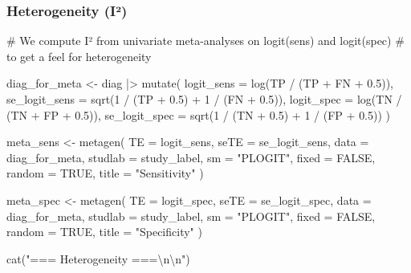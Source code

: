 \documentclass[
  letterpaper,
  DIV=11,
  numbers=noendperiod]{scrartcl}
\newenvironment{Shaded}{\begin{snugshade}}{\end{snugshade}}
\newcommand{\AttributeTok}[1]{\textcolor[rgb]{0.40,0.45,0.13}{#1}}
\newcommand{\CommentTok}[1]{\textcolor[rgb]{0.37,0.37,0.37}{#1}}
\newcommand{\ConstantTok}[1]{\textcolor[rgb]{0.56,0.35,0.01}{#1}}
\newcommand{\DecValTok}[1]{\textcolor[rgb]{0.68,0.00,0.00}{#1}}
\newcommand{\FloatTok}[1]{\textcolor[rgb]{0.68,0.00,0.00}{#1}}
\newcommand{\FunctionTok}[1]{\textcolor[rgb]{0.28,0.35,0.67}{#1}}
\newcommand{\NormalTok}[1]{\textcolor[rgb]{0.00,0.23,0.31}{#1}}
\newcommand{\OtherTok}[1]{\textcolor[rgb]{0.00,0.23,0.31}{#1}}
\newcommand{\SpecialCharTok}[1]{\textcolor[rgb]{0.37,0.37,0.37}{#1}}
\newcommand{\StringTok}[1]{\textcolor[rgb]{0.13,0.47,0.30}{#1}}
\begin{document}
\subsubsection{Heterogeneity (I²)}\label{heterogeneity-iuxb2}

\begin{Shaded}
\begin{Highlighting}[]
\CommentTok{\# We compute I² from univariate meta{-}analyses on logit(sens) and logit(spec)}
\CommentTok{\# to get a feel for heterogeneity}

\NormalTok{diag\_for\_meta }\OtherTok{\textless{}{-}}\NormalTok{ diag }\SpecialCharTok{|\textgreater{}}
  \FunctionTok{mutate}\NormalTok{(}
    \AttributeTok{logit\_sens =} \FunctionTok{log}\NormalTok{(TP }\SpecialCharTok{/}\NormalTok{ (TP }\SpecialCharTok{+}\NormalTok{ FN }\SpecialCharTok{+} \FloatTok{0.5}\NormalTok{)),}
    \AttributeTok{se\_logit\_sens =} \FunctionTok{sqrt}\NormalTok{(}\DecValTok{1} \SpecialCharTok{/}\NormalTok{ (TP }\SpecialCharTok{+} \FloatTok{0.5}\NormalTok{) }\SpecialCharTok{+} \DecValTok{1} \SpecialCharTok{/}\NormalTok{ (FN }\SpecialCharTok{+} \FloatTok{0.5}\NormalTok{)),}
    \AttributeTok{logit\_spec =} \FunctionTok{log}\NormalTok{(TN }\SpecialCharTok{/}\NormalTok{ (TN }\SpecialCharTok{+}\NormalTok{ FP }\SpecialCharTok{+} \FloatTok{0.5}\NormalTok{)),}
    \AttributeTok{se\_logit\_spec =} \FunctionTok{sqrt}\NormalTok{(}\DecValTok{1} \SpecialCharTok{/}\NormalTok{ (TN }\SpecialCharTok{+} \FloatTok{0.5}\NormalTok{) }\SpecialCharTok{+} \DecValTok{1} \SpecialCharTok{/}\NormalTok{ (FP }\SpecialCharTok{+} \FloatTok{0.5}\NormalTok{))}
\NormalTok{  )}

\NormalTok{meta\_sens }\OtherTok{\textless{}{-}} \FunctionTok{metagen}\NormalTok{(}
  \AttributeTok{TE =}\NormalTok{ logit\_sens, }\AttributeTok{seTE =}\NormalTok{ se\_logit\_sens,}
  \AttributeTok{data =}\NormalTok{ diag\_for\_meta,}
  \AttributeTok{studlab =}\NormalTok{ study\_label,}
  \AttributeTok{sm =} \StringTok{"PLOGIT"}\NormalTok{,}
  \AttributeTok{fixed =} \ConstantTok{FALSE}\NormalTok{, }\AttributeTok{random =} \ConstantTok{TRUE}\NormalTok{,}
  \AttributeTok{title =} \StringTok{"Sensitivity"}
\NormalTok{)}

\NormalTok{meta\_spec }\OtherTok{\textless{}{-}} \FunctionTok{metagen}\NormalTok{(}
  \AttributeTok{TE =}\NormalTok{ logit\_spec, }\AttributeTok{seTE =}\NormalTok{ se\_logit\_spec,}
  \AttributeTok{data =}\NormalTok{ diag\_for\_meta,}
  \AttributeTok{studlab =}\NormalTok{ study\_label,}
  \AttributeTok{sm =} \StringTok{"PLOGIT"}\NormalTok{,}
  \AttributeTok{fixed =} \ConstantTok{FALSE}\NormalTok{, }\AttributeTok{random =} \ConstantTok{TRUE}\NormalTok{,}
  \AttributeTok{title =} \StringTok{"Specificity"}
\NormalTok{)}

\FunctionTok{cat}\NormalTok{(}\StringTok{"=== Heterogeneity ===}\SpecialCharTok{\textbackslash{}n\textbackslash{}n}\StringTok{"}\NormalTok{)}
\end{Highlighting}
\end{Shaded}
\end{document}
